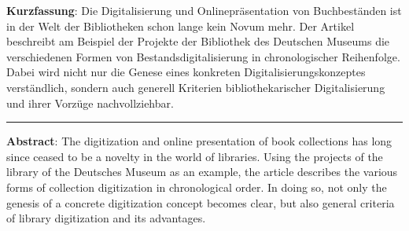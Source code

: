 \textbf{Kurzfassung}: Die Digitalisierung und Onlinepräsentation von
Buchbeständen ist in der Welt der Bibliotheken schon lange kein Novum
mehr. Der Artikel beschreibt am Beispiel der Projekte der Bibliothek des
Deutschen Museums die verschiedenen Formen von Bestandsdigitalisierung
in chronologischer Reihenfolge. Dabei wird nicht nur die Genese eines
konkreten Digitalisierungskonzeptes verständlich, sondern auch generell
Kriterien bibliothekarischer Digitalisierung und ihrer Vorzüge
nachvollziehbar.

\begin{center}\rule{0.5\linewidth}{0.5pt}\end{center}

\textbf{Abstract}: The digitization and online presentation of book
collections has long since ceased to be a novelty in the world of
libraries. Using the projects of the library of the Deutsches Museum as
an example, the article describes the various forms of collection
digitization in chronological order. In doing so, not only the genesis
of a concrete digitization concept becomes clear, but also general
criteria of library digitization and its advantages.
